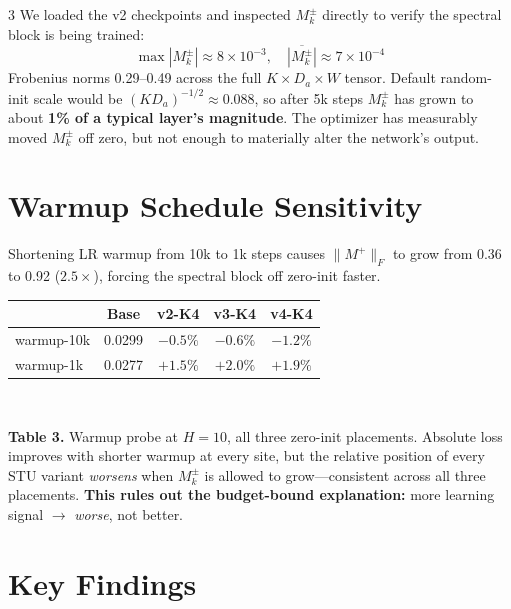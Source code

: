\documentclass[landscape]{article}
\renewcommand{\footnotesize}{\fontsize{17pt}{21pt}\selectfont}
\begin{document}
\begin{multicols}{3}
We loaded the v2 checkpoints and inspected $M_k^\pm$ directly to verify the spectral block is being trained:
$$\max|M^\pm_k| \approx 8\!\times\!10^{-3}, \quad \overline{|M^\pm_k|} \approx 7\!\times\!10^{-4}$$
Frobenius norms 0.29--0.49 across the full $K \times D_a \times W$ tensor. Default random-init scale would be $(KD_a)^{-1/2} \approx 0.088$, so after 5k steps $M_k^\pm$ has grown to about \textbf{1\% of a typical layer's magnitude}. The optimizer has measurably moved $M_k^\pm$ off zero, but not enough to materially alter the network's output.

\columnbreak

\section*{Warmup Schedule Sensitivity}

Shortening LR warmup from 10k to 1k steps causes $\|M^+\|_F$ to grow from 0.36 to 0.92 ($2.5\times$), forcing the spectral block off zero-init faster.

\begin{minipage}{\linewidth}
\centering
\footnotesize
\begin{tabular}{@{}lcccc@{}}
\toprule
& \textbf{Base} & \textbf{v2-K4} & \textbf{v3-K4} & \textbf{v4-K4} \\
\midrule
warmup-10k & 0.0299 & $-0.5\%$ & $-0.6\%$ & $-1.2\%$ \\
warmup-1k  & 0.0277 & $+1.5\%$ & $+2.0\%$ & $+1.9\%$ \\
\bottomrule
\end{tabular}
\\[0.4em]
\raggedright
\textbf{Table 3.} Warmup probe at $H{=}10$, all three zero-init placements. Absolute loss improves with shorter warmup at every site, but the relative position of every STU variant \emph{worsens} when $M_k^\pm$ is allowed to grow---consistent across all three placements. \textbf{This rules out the budget-bound explanation:} more learning signal $\to$ \emph{worse}, not better.
\end{minipage}

\section*{Key Findings}


\end{multicols}
\end{document}
